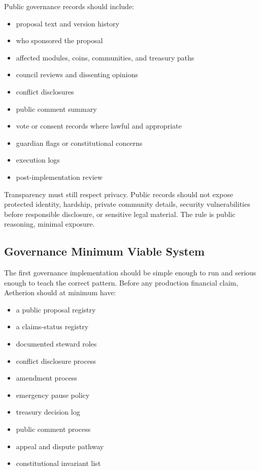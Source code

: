 \documentclass[12pt]{article}
\begin{document}
Public governance records should include:

\begin{itemize}
  \item proposal text and version history
  \item who sponsored the proposal
  \item affected modules, coins, communities, and treasury paths
  \item council reviews and dissenting opinions
  \item conflict disclosures
  \item public comment summary
  \item vote or consent records where lawful and appropriate
  \item guardian flags or constitutional concerns
  \item execution logs
  \item post-implementation review
\end{itemize}

Transparency must still respect privacy. Public records should not expose protected identity, hardship, private community details, security vulnerabilities before responsible disclosure, or sensitive legal material. The rule is public reasoning, minimal exposure.

\subsection{Governance Minimum Viable System}

The first governance implementation should be simple enough to run and serious enough to teach the correct pattern. Before any production financial claim, Aetherion should at minimum have:

\begin{itemize}
  \item a public proposal registry
  \item a claims-status registry
  \item documented steward roles
  \item conflict disclosure process
  \item amendment process
  \item emergency pause policy
  \item treasury decision log
  \item public comment process
  \item appeal and dispute pathway
  \item constitutional invariant list
\end{itemize}
\end{document}
